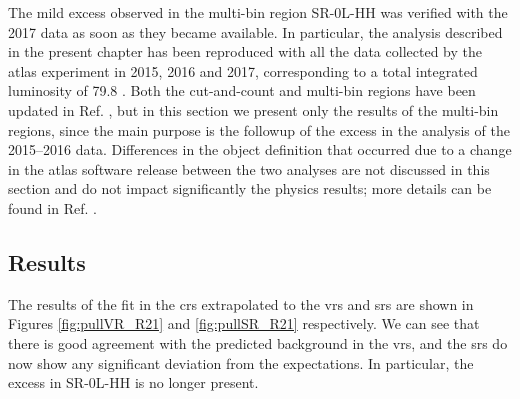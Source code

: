 The mild excess observed in the multi-bin region SR-0L-HH was verified with the 2017 data 
as soon as they became available. 
In particular, the analysis described in the present chapter has been reproduced with 
all the data collected by the \gls{atlas} experiment in 2015, 2016 and 2017, 
corresponding to a total integrated luminosity of 79.8 \ifb. 
Both the cut-and-count and multi-bin regions have been updated in Ref. \cite{ATLAS-CONF-2018-041}, 
but in this section we present only the results 
of the multi-bin regions, since the main purpose is the followup of the excess in the analysis of the 2015--2016 data.
Differences in the object definition that occurred due to a change in the \gls{atlas} software release between the 
two analyses are not discussed in this section and do not impact significantly the physics results; more details can be found 
in Ref. \cite{ATLAS-CONF-2018-041}.


\subsection{Results}

The results of the fit in the \glspl{cr} extrapolated to the \glspl{vr} and \glspl{sr} are shown in Figures 
\ref{fig:pullVR_R21} and \ref{fig:pullSR_R21} respectively. 
We can see that there is good agreement with the predicted background in the \glspl{vr}, and the \glspl{sr} do now show any 
significant deviation from the expectations. 
In particular, the excess in SR-0L-HH is no longer present. 


